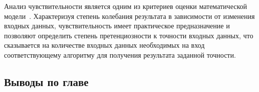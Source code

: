 Анализ чувствительности является одним из критериев оценки математической модели~\cite{WOS5_sensitivity,WOS2_sensitivity,WOS6_sensitivity}. Характеризуя степень колебания результата в зависимости от изменения входных данных, чувствительность имеет практическое предназначение и позволяют определить степень претенциозности к точности входных данных, что сказывается на количестве входных данных необходимых на вход соответствующему алгоритму для получения результата заданной точности.    


\subsection{Выводы по главе}


